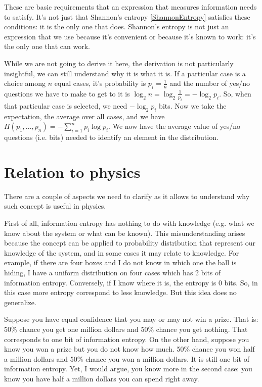 \documentclass[aps,pra,10pt,floatfix,nofootinbib]{revtex4-1}
\theoremstyle{definition}
\begin{document}
These are basic requirements that an expression that measures information needs to satisfy. It's not just that Shannon's entropy \eqref{ShannonEntropy} satisfies these conditions: it is the only one that does. Shannon's entropy is not just an expression that we use because it's convenient or because it's known to work: it's the only one that can work.

While we are not going to derive it here, the derivation is not particularly insightful, we can still understand why it is what it is. If a particular case is a choice among $n$ equal cases, it's probability is $p_i=\frac{1}{n}$ and the number of yes/no questions we have to make to get to it is $\log_2 n = \log_2 \frac{1}{p_i} = - \log_2 p_i$. So, when that particular case is selected, we need $- \log_2 p_i$ bits. Now we take the expectation, the average over all cases, and we have $H(p_1, ..., p_n) = - \sum_{i=1}^{n} p_i \log p_i$. We now have the average value of yes/no questions (i.e. bits) needed to identify an element in the distribution.

\section{Relation to physics}

There are a couple of aspects we need to clarify as it allows to understand why such concept is useful in physics.

First of all, information entropy has nothing to do with knowledge (e.g. what we know about the system or what can be known). This misunderstanding arises because the concept can be applied to probability distribution that represent our knowledge of the system, and in some cases it may relate to knowledge. For example, if there are four boxes and I do not know in which one the ball is hiding, I have a uniform distribution on four cases which has 2 bits of information entropy. Conversely, if I know where it is, the entropy is 0 bits. So, in this case more entropy correspond to less knowledge. But this idea does no generalize.

Suppose you have equal confidence that you may or may not win a prize. That is: 50\% chance you get one million dollars and 50\% chance you get nothing. That corresponds to one bit of information entropy. On the other hand, suppose you know you won a prize but you do not know how much. 50\% chance you won half a million dollars and 50\% chance you won a million dollars. It is still one bit of information entropy. Yet, I would argue, you know more in the second case: you know you have half a million dollars you can spend right away.
\end{document}
